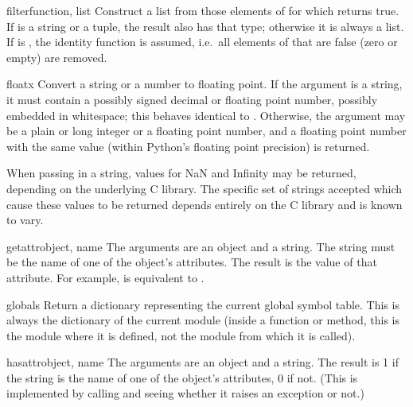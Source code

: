 \begin{funcdesc}{filter}{function, list}
Construct a list from those elements of  for which
 returns true.  If  is a string or a tuple,
the result also has that type; otherwise it is always a list.  If
 is , the identity function is assumed,
i.e.\ all elements of  that are false (zero or empty) are
removed.
\end{funcdesc}

\begin{funcdesc}{float}{x}
  Convert a string or a number to floating point.  If the argument is a
  string, it must contain a possibly signed decimal or floating point
  number, possibly embedded in whitespace; this behaves identical to
  .  Otherwise, the argument may be a plain
  or long integer or a floating point number, and a floating point
  number with the same value (within Python's floating point
  precision) is returned.

   When passing in a string, values for NaN
  and Infinity may be returned, depending on the
  underlying C library.  The specific set of strings accepted which
  cause these values to be returned depends entirely on the C library
  and is known to vary.
\end{funcdesc}

\begin{funcdesc}{getattr}{object, name}
  The arguments are an object and a string.  The string must be the
  name of one of the object's attributes.  The result is the value of
  that attribute.  For example,  is equivalent to .
\end{funcdesc}

\begin{funcdesc}{globals}{}
Return a dictionary representing the current global symbol table.
This is always the dictionary of the current module (inside a
function or method, this is the module where it is defined, not the
module from which it is called).
\end{funcdesc}

\begin{funcdesc}{hasattr}{object, name}
  The arguments are an object and a string.  The result is 1 if the
  string is the name of one of the object's attributes, 0 if not.
  (This is implemented by calling  and seeing whether it raises an exception or not.)
\end{funcdesc}

